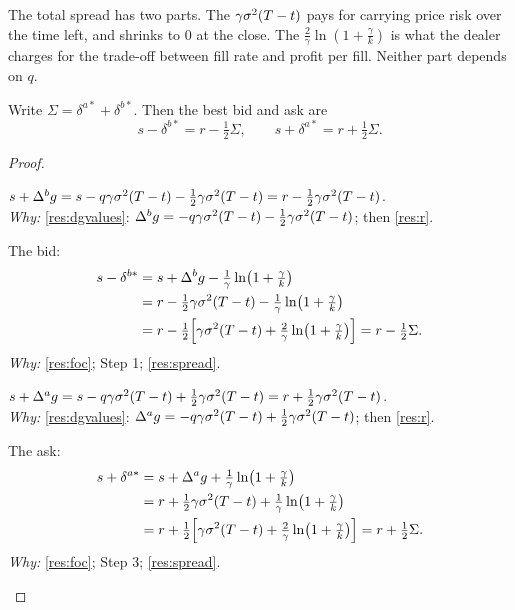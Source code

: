 The total spread has two parts. The  $\gamma\sigma^2(T-t)$ pays for carrying price risk over the time left, and shrinks to $0$ at the close. The  $\frac2\gamma\ln(1+\frac\gamma k)$ is what the dealer charges for the trade-off between fill rate and profit per fill. Neither part depends on $q$.

\begin{result}
\label{res:quotes}
Write $\Sigma=\delta^{a*}+\delta^{b*}$. Then the best bid and ask are
\[
  s-\delta^{b*}=r-\tfrac12\Sigma,\qquad s+\delta^{a*}=r+\tfrac12\Sigma .
\]
\end{result}

\begin{proof}
\begin{steps}
  \item $s+\Delta^bg=s-q\gamma\sigma^2(T-t)-\tfrac12\gamma\sigma^2(T-t)=r-\tfrac12\gamma\sigma^2(T-t)$.
  \\ \emph{Why:} \cref{res:dgvalues}: $\Delta^bg=-q\gamma\sigma^2(T-t)-\tfrac12\gamma\sigma^2(T-t)$; then \cref{res:r}.
  \item The bid:
  \[
    \begin{aligned}
      s-\delta^{b*}&=s+\Delta^bg-\tfrac{1}{\gamma}\ln\!\big(1+\tfrac{\gamma}{k}\big)\\
      &=r-\tfrac12\gamma\sigma^2(T-t)-\tfrac{1}{\gamma}\ln\!\big(1+\tfrac{\gamma}{k}\big)\\
      &=r-\tfrac12\Big[\gamma\sigma^2(T-t)+\tfrac2\gamma\ln\!\big(1+\tfrac\gamma k\big)\Big]=r-\tfrac12\Sigma.
    \end{aligned}
  \]
  \emph{Why:} \cref{res:foc}; Step 1; \cref{res:spread}.
  \item $s+\Delta^ag=s-q\gamma\sigma^2(T-t)+\tfrac12\gamma\sigma^2(T-t)=r+\tfrac12\gamma\sigma^2(T-t)$.
  \\ \emph{Why:} \cref{res:dgvalues}: $\Delta^ag=-q\gamma\sigma^2(T-t)+\tfrac12\gamma\sigma^2(T-t)$; then \cref{res:r}.
  \item The ask:
  \[
    \begin{aligned}
      s+\delta^{a*}&=s+\Delta^ag+\tfrac{1}{\gamma}\ln\!\big(1+\tfrac{\gamma}{k}\big)\\
      &=r+\tfrac12\gamma\sigma^2(T-t)+\tfrac{1}{\gamma}\ln\!\big(1+\tfrac{\gamma}{k}\big)\\
      &=r+\tfrac12\Big[\gamma\sigma^2(T-t)+\tfrac2\gamma\ln\!\big(1+\tfrac\gamma k\big)\Big]=r+\tfrac12\Sigma.
    \end{aligned}
  \]
  \emph{Why:} \cref{res:foc}; Step 3; \cref{res:spread}.
\end{steps}
\end{proof}

